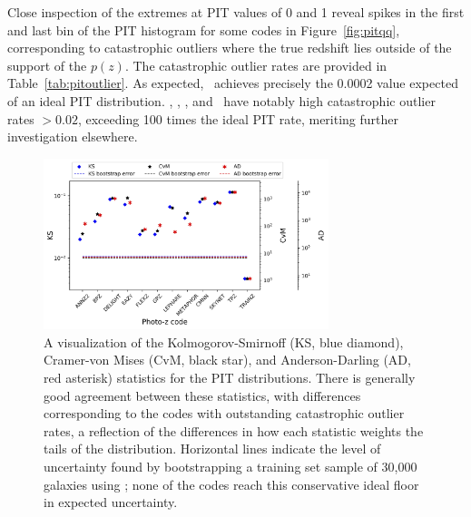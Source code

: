 Close inspection of the extremes at PIT values of 0 and 1 reveal spikes in the first and last bin of the PIT histogram for some codes in Figure~\ref{fig:pitqq}, corresponding to catastrophic outliers where the true redshift lies outside of the support of the $p(z)$.
The catastrophic outlier rates are provided in Table~\ref{tab:pitoutlier}.
As expected, \trainz\ achieves precisely the 0.0002 value expected of an ideal PIT distribution.
\annz, \flexzboost, \lephare, and \metaphor\ have notably high catastrophic outlier rates $> 0.02$, exceeding 100 times the ideal PIT rate, meriting further investigation elsewhere.

\begin{figure}
\centering
\includegraphics[width=0.74\textwidth]{fig/KSvsCvMvsAD_PIT_withnull_jpg.jpg}
\caption{A visualization of the Kolmogorov-Smirnoff (KS, blue diamond), Cramer-von Mises (CvM, black star), and Anderson-Darling (AD, red asterisk) statistics for the PIT distributions.
There is generally good agreement between these statistics, with differences corresponding to the codes with outstanding catastrophic outlier rates, a reflection of the differences in how each statistic weights the tails of the distribution.
Horizontal lines indicate the level of uncertainty found by bootstrapping a training set sample of 30,000 galaxies using \trainz; none of the codes reach this conservative ideal floor in expected uncertainty.}
\label{fig:pit_stats}
\end{figure}


